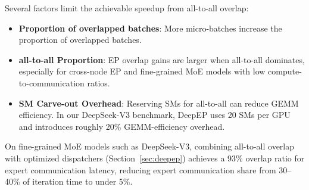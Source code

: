 Several factors limit the achievable speedup from all-to-all overlap:
\begin{itemize}
    \item \textbf{Proportion of overlapped batches}: More micro-batches increase the proportion of overlapped batches.
    \item \textbf{all-to-all Proportion}: EP overlap gains are larger when all-to-all dominates, especially for cross-node EP and fine-grained MoE models with low compute-to-communication ratios.
    \item \textbf{SM Carve-out Overhead}: Reserving SMs for all-to-all can reduce GEMM efficiency. In our DeepSeek-V3 benchmark, DeepEP uses 20 SMs per GPU and introduces roughly 20\% GEMM-efficiency overhead.
\end{itemize}

On fine-grained MoE models such as DeepSeek-V3, combining all-to-all overlap with optimized dispatchers (Section~\ref{sec:deepep}) achieves a 93\% overlap ratio for expert communication latency, reducing expert communication share from 30--40\% of iteration time to under 5\%.





